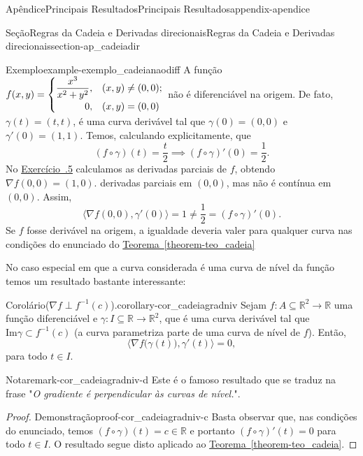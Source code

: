 \documentclass[oneside,10pt,]{book}
\newcommand{\xreffont}{\relax}
\numberwithin{equation}{section}
\newcommand{\R}{\mathbb R}
\begin{document}
\begin{appendixptx}{Apêndice}{Principais Resultados}{}{Principais Resultados}{}{}{appendix-apendice}
\begin{sectionptx}{Seção}{Regras da Cadeia e Derivadas direcionais}{}{Regras da Cadeia e Derivadas direcionais}{}{}{section-ap_cadeiadir}
\begin{example}{Exemplo}{}{example-exemplo_cadeianaodiff}
A função \(f(x,y)=\begin{cases}
\dfrac{x^3}{x^2+y^2},&(x,y)\neq (0,0);\\ \hfill 0,&
(x,y)=(0,0)\end{cases}\) não é diferenciável na origem. De fato, \(\gamma(t)=(t,t)\), é uma curva derivável tal que \(\gamma(0)=(0,0)\) e \(\gamma'(0)=(1,1)\). Temos, calculando explicitamente, que%
\begin{equation*}
(f\circ \gamma)(t)=\dfrac{t}{2}\implies
(f\circ \gamma)'(0)=\dfrac{1}{2}\text{.}
\end{equation*}
No \hyperlink{exercise-dif5}{Exercício~{\xreffont 1.5.5}} calculamos as derivadas parciais de \(f\), obtendo \(\nabla
f(0,0)=(1,0)\). derivadas parciais em \((0,0)\), mas não é contínua em \((0,0)\). Assim,%
\begin{equation*}
\big\langle\nabla
f(0,0),\gamma'(0)\big\rangle=1\neq\frac{1}{2}=(f\circ
\gamma)'(0).
\end{equation*}
Se \(f\) fosse derivável na origem, a igualdade deveria valer para qualquer curva nas condições do enunciado do \hyperref[theorem-teo_cadeia]{Teorema~{\xreffont\ref{theorem-teo_cadeia}}}%
\end{example}
No caso especial em que a curva considerada é uma curva de nível da função temos um resultado bastante interessante:%
\begin{corollary}{Corolário}{(\(\nabla f\perp f^{-1}(c)\)).}{}{corollary-cor_cadeiagradniv}%
Sejam \(f\colon A\subseteq\R^2\to\R\) uma função diferenciável e \(\gamma\colon I\subseteq\R\to\R^2\), que é uma curva derivável tal que \(\mathrm{Im}\gamma\subset f^{-1}(c)\) (a curva parametriza parte de uma curva de nível de \(f\)). Então,%
\begin{equation*}
\Big\langle\nabla
f\big(\gamma(t)\big),\gamma'(t)\Big\rangle=0,
\end{equation*}
para todo \(t\in I\).\begin{remark}{Nota}{}{remark-cor_cadeiagradniv-d}%
Este é o famoso resultado que se traduz na frase "\emph{O gradiente é perpendicular às curvas de nível.}".\end{remark}
\end{corollary}
\begin{proof}{Demonstração}{}{proof-cor_cadeiagradniv-c}
Basta observar que, nas condições do enunciado, temos \((f\circ\gamma)(t)=c\in\R\) e portanto \((f\circ\gamma)'(t)=0\) para todo \(t\in I\). O resultado segue disto aplicado ao \hyperref[theorem-teo_cadeia]{Teorema~{\xreffont\ref{theorem-teo_cadeia}}}.\end{proof}

\end{sectionptx}
\end{appendixptx}
\end{document}
